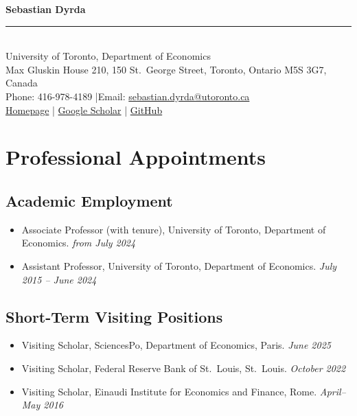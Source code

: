 \documentclass[letterpaper]{article}
\def\name{Sebastian Dyrda}
\newcommand{\dt}[1]{\hfill\textit{#1}}
\begin{document}
\begin{center}
  {\Huge\bfseries\color{customblue}\name}\\[7pt]
  {\color{customblue}\rule{\textwidth}{1pt}}\\[6pt]
  \small
  University of Toronto, Department of Economics \\
  Max Gluskin House 210, 150 St.\ George Street, Toronto, Ontario M5S 3G7, Canada \\
  Phone: 416-978-4189 \quad|\quad Email: \href{mailto:sebastian.dyrda@utoronto.ca}{sebastian.dyrda@utoronto.ca} \\
  \href{https://dyrda.info}{Homepage} \quad|\quad
  \href{https://scholar.google.com/citations?user=vXdGz4sAAAAJ&hl=en&oi=ao}{Google Scholar} \quad|\quad
  \href{https://github.com/sebastiandyrda}{GitHub}
\end{center}
\thispagestyle{titlepage}

\vspace{2pt}

\section*{Professional Appointments}

\subsection*{Academic Employment}
\begin{itemize}
\item Associate Professor (with tenure), University of Toronto, Department of Economics. \dt{from July 2024}
\item Assistant Professor, University of Toronto, Department of Economics. \dt{July 2015 -- June 2024}
\end{itemize}

\subsection*{Short-Term Visiting Positions}
\begin{itemize}
\item Visiting Scholar, SciencesPo, Department of Economics, Paris. \dt{June 2025}
\item Visiting Scholar, Federal Reserve Bank of St.\ Louis, St.\ Louis. \dt{October 2022}
\item Visiting Scholar, Einaudi Institute for Economics and Finance, Rome. \dt{April--May 2016}
\end{itemize}
\end{document}
